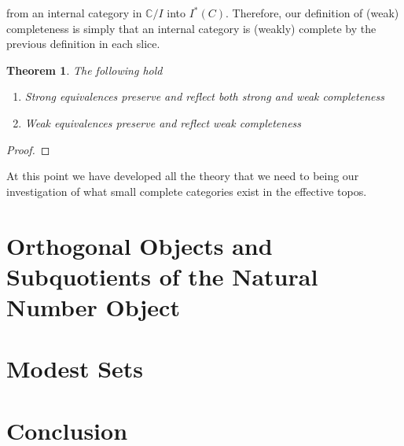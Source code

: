 \documentclass[12pt]{amsart}
\newcommand{\todo}[1]{{\color{red}{\LARGE #1}}}
\newcommand{\Ccat}{\ensuremath{\mathbb{C}}}
\newtheorem{thm}{Theorem}[section]
\begin{document}
from an internal category in $\Ccat/I$ into $I^*(C)$. Therefore, our
definition of (weak) completeness is simply that an internal category
is (weakly) complete by the previous definition in each slice.
\begin{thm}\label{thm:complete:preservation}
  The following hold
  \begin{enumerate}
  \item Strong equivalences preserve and reflect both strong and weak
    completeness
  \item Weak equivalences preserve and reflect weak completeness
  \end{enumerate}
\end{thm}
\begin{proof}
  \todo{This is tricky but important}
\end{proof}
At this point we have developed all the theory that we need to being
our investigation of what small complete categories exist in the
effective topos.
\section{Orthogonal Objects and Subquotients of the Natural Number Object}\label{sec:orth}
\section{Modest Sets}\label{sec:modest}
\section{Conclusion}\label{sec:conclusion}


{}
\end{document}
